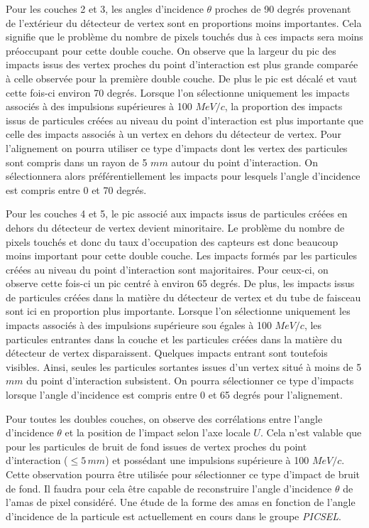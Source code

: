   \medskip
  
  Pour les couches 2 et 3, les angles d'incidence $\theta$ proches de 90 degr\'es provenant de l'extérieur du d\'etecteur de vertex sont en proportions moins importantes. Cela signifie que le probl\`eme du nombre de pixels touch\'es dus \`a ces impacts sera moins pr\'eoccupant pour cette double couche. On observe que la largeur du pic des impacts issus des vertex proches du point d'interaction est plus grande compar\'ee \`a celle observ\'ee pour la premi\`ere double couche. De plus le pic est d\'ecal\'e et vaut cette fois-ci environ 70 degr\'es. Lorsque l'on s\'electionne uniquement les impacts associ\'es \`a des impulsions sup\'erieures \`a 100 $MeV/c$, la proportion des impacts issus de particules cr\'e\'ees au niveau du point d'interaction est plus importante que celle des impacts associ\'es \`a un vertex en dehors du d\'etecteur de vertex. Pour l'alignement on pourra utiliser ce type d'impacts dont les vertex des particules sont compris dans un rayon de 5 $mm$ autour du point d'interaction. On sélectionnera alors pr\'ef\'erentiellement les impacts pour lesquels l'angle d'incidence est compris entre 0 et 70 degr\'es. 
  
  \medskip
  
  Pour les couches 4 et 5, le pic associ\'e aux impacts issus de particules cr\'e\'ees en dehors du d\'etecteur de vertex devient minoritaire. Le probl\`eme du nombre de pixels touch\'es et donc du taux d'occupation des capteurs est donc beaucoup moins important pour cette double couche. Les impacts form\'es par les particules cr\'e\'ees au niveau du point d'interaction sont majoritaires. Pour ceux-ci, on observe cette fois-ci un pic centr\'e \`a environ 65 degr\'es. De plus, les impacts issus de particules cr\'e\'ees dans la mati\`ere du d\'etecteur de vertex et du tube de faisceau sont ici en proportion plus importante. Lorsque l'on s\'electionne uniquement les impacts associ\'es \`a des impulsions sup\'erieure sou \'egales \`a 100 $MeV/c$, les particules entrantes dans la couche et les particules cr\'e\'ees dans la mati\`ere du d\'etecteur de vertex disparaissent. Quelques impacts entrant sont toutefois visibles. Ainsi, seules les particules sortantes issues d'un vertex situ\'e \`a moins de 5 $mm$ du point d'interaction subsistent. On pourra sélectionner ce type d'impacts lorsque l'angle d'incidence est compris entre 0 et 65 degr\'es pour l'alignement.  
  
  \medskip

  Pour toutes les doubles couches, on observe des corr\'elations entre l'angle d'incidence $\theta$ et la position de l'impact selon l'axe locale $U$. Cela n'est valable que pour les particules de bruit de fond issues de vertex proches du point d'interaction ($\leq 5 \, mm$) et poss\'edant une impulsions sup\'erieure \`a 100 $MeV/c$. Cette observation pourra \^etre utilis\'ee pour sélectionner ce type d'impact de bruit de fond. Il faudra pour cela \^etre capable de reconstruire l'angle d'incidence $\theta$ de l'amas de pixel consid\'er\'e. Une \'etude de la forme des amas en fonction de l'angle d'incidence de la particule est actuellement en cours dans le groupe \textit{PICSEL}.
  
